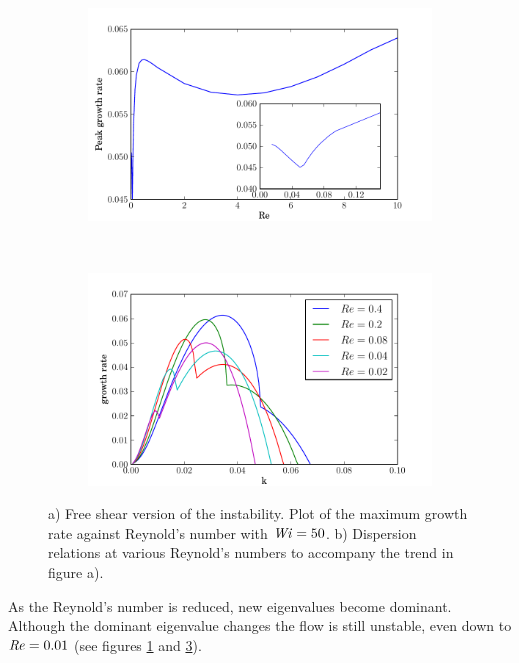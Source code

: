 \documentclass{jfm}
\newcommand\Wi{\mbox{\textit{Wi}}}
\newcommand\Rey{\mbox{\textit{Re}}}  %
\begin{document}
\begin{figure} 
    \centering 
    \begin{subfigure}[b]{0.48\textwidth} 
	\centering
	\includegraphics[width=\textwidth]{inf_vary_Re} 
	\caption{}
	\label{fig:inf_vary_Re} 
    \end{subfigure} ~
    \begin{subfigure}[b]{0.48\textwidth} 
	\centering
	\includegraphics[width=\textwidth]{inf_dispersions_low_Wi} 
	\caption{}
	\label{fig:dispersions_low_Wi} 
    \end{subfigure} 
    \caption{ 
	a) Free shear version of the instability. Plot of the maximum growth
	rate against Reynold's number with $\Wi=50$. b) Dispersion relations at
	various Reynold's numbers to accompany the trend in figure a).  
    }
\end{figure}

As the Reynold's number is reduced, new eigenvalues become dominant. Although
the dominant eigenvalue changes the flow is still unstable, even down to $\Rey
= 0.01$ (see figures \ref{fig:inf_vary_Re} and \ref{fig:dispersions_low_Wi}).
\end{document}
